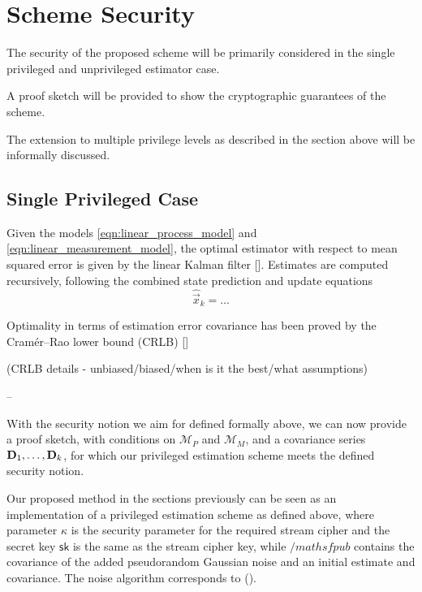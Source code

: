 \documentclass[conference]{IEEEtran}
\theoremstyle{definition}
\theoremstyle{definition}
\theoremstyle{remark}
\begin{document}
\section{Scheme Security}
The security of the proposed scheme will be primarily considered in the single privileged and unprivileged estimator case.

A proof sketch will be provided to show the cryptographic guarantees of the scheme.

The extension to multiple privilege levels as described in the section above will be informally discussed.

\subsection{Single Privileged Case}

Given the models \eqref{eqn:linear_process_model} and \eqref{eqn:linear_measurement_model}, the optimal estimator with respect to mean squared error is given by the linear Kalman filter []. Estimates are computed recursively, following the combined state prediction and update equations
\begin{equation}
   \hat{\vec{x}}_k = \dots
\end{equation}

Optimality in terms of estimation error covariance has been proved by the Cramér–Rao lower bound (CRLB) []

(CRLB details - unbiased/biased/when is it the best/what assumptions)

--

With the security notion we aim for defined formally above, we can now provide a proof sketch, with conditions on $\mathcal{M}_P$ and $\mathcal{M}_M$, and a covariance series ${{\mathbf{D}}}_1,\dots,{{\mathbf{D}}}_k$, for which our privileged estimation scheme meets the defined security notion.

Our proposed method in the sections previously can be seen as an implementation of a privileged estimation scheme as defined above, where parameter $\kappa$ is the security parameter for the required stream cipher and the secret key $\mathsf{sk}$ is the same as the stream cipher key, while $/mathsf{pub}$ contains the covariance of the added pseudorandom Gaussian noise and an initial estimate and covariance. The noise algorithm corresponds to ().
\end{document}
